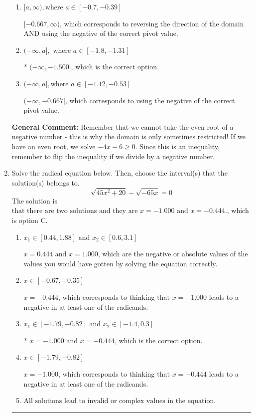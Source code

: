\documentclass{extbook}[14pt]
\newcommand{\litem}[1]{\item #1

\rule{\textwidth}{0.4pt}}
\begin{document}
\begin{enumerate}
{\begin{enumerate}[label=\Alph*.]
 $[-1.500, \infty)$, which corresponds to reversing the direction of the domain.
\item \( [a, \infty), \text{where } a \in [-0.7, -0.39] \)

$[-0.667, \infty)$, which corresponds to reversing the direction of the domain AND using the negative of the correct pivot value.
\item \( (-\infty, a], \text{ where } a \in [-1.8, -1.31] \)

* $(-\infty, -1.500]$, which is the correct option.
\item \( (-\infty, a], \text{where } a \in [-1.12, -0.53] \)

$(-\infty, -0.667]$, which corresponds to using the negative of the correct pivot value.
\end{enumerate}

\textbf{General Comment:} Remember that we cannot take the even root of a negative number - this is why the domain is only sometimes restricted! If we have an even root, we solve $-4 x - 6 \geq 0$. Since this is an inequality, remember to flip the inequality if we divide by a negative number.
}
\litem{
Solve the radical equation below. Then, choose the interval(s) that the solution(s) belongs to.
\[ \sqrt{45 x^2 + 20} - \sqrt{-65 x} = 0 \]The solution is \( \text{that there are two solutions and they are } x = -1.000 \text{ and } x = -0.444. \), which is option C.\begin{enumerate}[label=\Alph*.]
\item \( x_1 \in [0.44, 1.88] \text{ and } x_2 \in [0.6,3.1] \)

$x = 0.444 \text{ and } x = 1.000$, which are the negative or absolute values of the values you would have gotten by solving the equation correctly.
\item \( x \in [-0.67,-0.35] \)

$x = -0.444$, which corresponds to thinking that $x = -1.000$ leads to a negative in at least one of the radicands.
\item \( x_1 \in [-1.79, -0.82] \text{ and } x_2 \in [-1.4,0.3] \)

* $x = -1.000 \text{ and } x = -0.444$, which is the correct option.
\item \( x \in [-1.79,-0.82] \)

$x = -1.000$, which corresponds to thinking that $x = -0.444$ leads to a negative in at least one of the radicands.
\item \( \text{All solutions lead to invalid or complex values in the equation.} \)


\end{enumerate}}
\end{enumerate}
\end{document}
